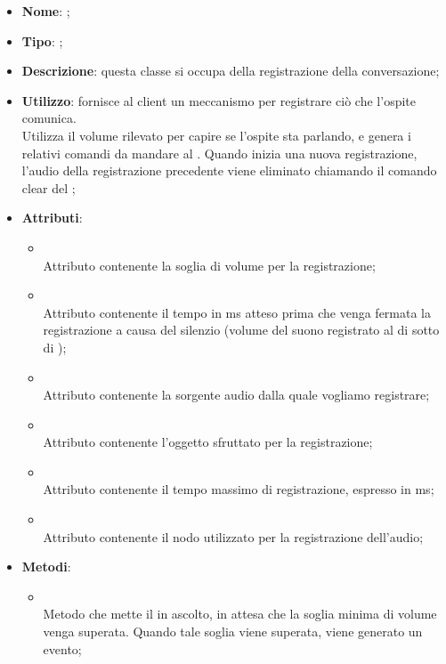 \begin{itemize}
	\item \textbf{Nome}: ;
	\item \textbf{Tipo}: ;
	\item \textbf{Descrizione}: questa classe si occupa della registrazione della conversazione;
	\item \textbf{Utilizzo}: fornisce al client un meccanismo per registrare ciò che l'ospite comunica. \\
Utilizza il volume rilevato per capire se l'ospite sta parlando, e genera i relativi comandi da mandare al . Quando inizia una nuova registrazione, l'audio della registrazione precedente viene eliminato chiamando il comando clear del ;
	\item \textbf{Attributi}:
	\begin{itemize}
		\item[]  \\
		Attributo contenente la soglia di volume per la registrazione;
		\item[]  \\
		Attributo contenente il tempo in ms atteso prima che venga fermata la registrazione a causa del silenzio (volume del suono registrato al di sotto di );
		\item[]  \\
		Attributo contenente la sorgente audio dalla quale vogliamo registrare;
		\item[]  \\
		Attributo contenente l'oggetto  sfruttato per la registrazione;
		\item[]  \\
		Attributo contenente il tempo massimo di registrazione, espresso in ms;
		\item[]  \\
		Attributo contenente il nodo utilizzato per la registrazione dell'audio;
	\end{itemize}
	\item \textbf{Metodi}:
	\begin{itemize}
		\item[]  \\		Metodo che mette il  in ascolto, in attesa che la soglia minima di volume venga superata. Quando tale soglia viene superata, viene generato un evento;\\

\end{itemize}
\end{itemize}
